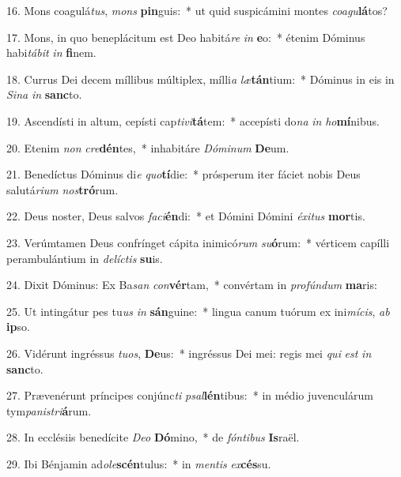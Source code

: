 16. Mons coagulá\textit{tus}, \textit{mons} \textbf{pin}guis:~*  ut quid suspicámini montes \textit{co}\textit{a}\textit{gu}\textbf{lá}tos?\

17. Mons, in quo beneplácitum est Deo habitá\textit{re} \textit{in} \textbf{e}o:~*  étenim Dóminus habi\textit{tá}\textit{bit} \textit{in} \textbf{fi}nem.\

18. Currus Dei decem míllibus múltiplex, mílli\textit{a} \textit{læ}\textbf{tán}tium:~*  Dóminus in eis in \textit{Si}\textit{na} \textit{in} \textbf{sanc}to.\

19. Ascendísti in altum, cepísti cap\textit{ti}\textit{vi}\textbf{tá}tem:~*  accepísti do\textit{na} \textit{in} \textit{ho}\textbf{mí}nibus.\

20. Etenim \textit{non} \textit{cre}\textbf{dén}tes,~*  inhabitáre \textit{Dó}\textit{mi}\textit{num} \textbf{De}um.\

21. Benedíctus Dóminus di\textit{e} \textit{quo}\textbf{tí}die:~*  prósperum iter fáciet nobis Deus salutá\textit{ri}\textit{um} \textit{nos}\textbf{tró}rum.\

22. Deus noster, Deus salvos \textit{fa}\textit{ci}\textbf{én}di:~*  et Dómini Dómini \textit{éx}\textit{i}\textit{tus} \textbf{mor}tis.\

23. Verúmtamen Deus confrínget cápita inimicó\textit{rum} \textit{su}\textbf{ó}rum:~*  vérticem capílli perambulántium in \textit{de}\textit{líc}\textit{tis} \textbf{su}is.\

24. Dixit Dóminus: Ex Ba\textit{san} \textit{con}\textbf{vér}tam,~*  convértam in \textit{pro}\textit{fún}\textit{dum} \textbf{ma}ris:\

25. Ut intingátur pes tu\textit{us} \textit{in} \textbf{sán}guine:~*  lingua canum tuórum ex ini\textit{mí}\textit{cis}, \textit{ab} \textbf{ip}so.\

26. Vidérunt ingréssus \textit{tu}\textit{os}, \textbf{De}us:~*  ingréssus Dei mei: regis mei \textit{qui} \textit{est} \textit{in} \textbf{sanc}to.\

27. Prævenérunt príncipes conjúnc\textit{ti} \textit{psal}\textbf{lén}tibus:~*  in médio juvenculárum tym\textit{pa}\textit{nis}\textit{tri}\textbf{á}rum.\

28. In ecclésiis benedícite \textit{De}\textit{o} \textbf{Dó}mino,~*  de \textit{fón}\textit{ti}\textit{bus} \textbf{Is}raël.\

29. Ibi Bénjamin ad\textit{o}\textit{le}\textbf{scén}tulus:~*  in \textit{men}\textit{tis} \textit{ex}\textbf{cés}su.\


